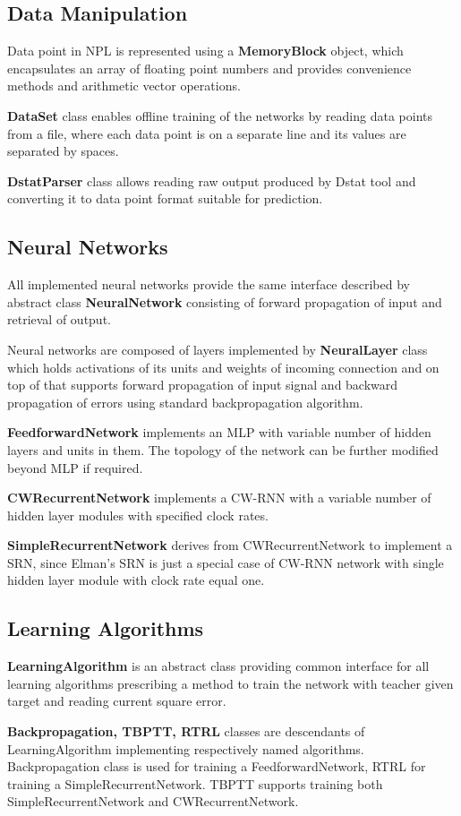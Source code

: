 \documentclass[12pt,oneside]{fithesis2}
\begin{document}
\subsection{Data Manipulation}
	Data point in NPL is represented using a \textbf{MemoryBlock} object, which encapsulates an array of floating point numbers and provides convenience methods and arithmetic vector operations.\par
	\textbf{DataSet} class enables offline training of the networks by reading data points from a file, where each data point is on a separate line and its values are separated by spaces. \par
	\textbf{DstatParser} class allows reading raw output produced by Dstat tool and converting it to data point format suitable for prediction.
\subsection{Neural Networks}
All implemented neural networks provide the same interface described by abstract class \textbf{NeuralNetwork} consisting of forward propagation of input and retrieval of output. \par
Neural networks are composed of layers implemented by \textbf{NeuralLayer} class which holds activations of its units and weights of incoming connection and on top of that supports forward propagation of input signal and backward propagation of errors using standard backpropagation algorithm. \par
\textbf{FeedforwardNetwork} implements an MLP with variable number of hidden layers and units in them. The topology of the network can be further modified beyond MLP if required. \par
\textbf{CWRecurrentNetwork} implements a CW-RNN with a variable number of hidden layer modules with specified clock rates. \par
\textbf{SimpleRecurrentNetwork} derives from CWRecurrentNetwork to implement a SRN, since Elman's SRN is just a special case of CW-RNN network with single hidden layer module with clock rate equal one. \par

\subsection{Learning Algorithms}
\textbf{LearningAlgorithm} is an abstract class providing common interface for all learning algorithms prescribing a method to train the network with teacher given target and reading current square error. \par
\textbf{Backpropagation, TBPTT, RTRL} classes are descendants of LearningAlgorithm implementing respectively named algorithms. Backpropagation class is used for training a FeedforwardNetwork, RTRL for training a SimpleRecurrentNetwork. TBPTT supports training both SimpleRecurrentNetwork and CWRecurrentNetwork.
\end{document}
